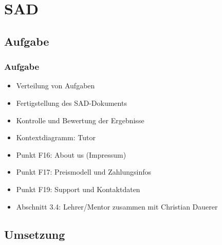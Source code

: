 \section{SAD}
\subsection{Aufgabe}

\begin{frame} %
  \frametitle{Aufgabe} %

  	\begin{itemize}
   		\item Verteilung von Aufgaben
   		\item Fertigstellung des SAD-Dokuments
   		\item Kontrolle und Bewertung der Ergebnisse
  	\end{itemize}
	\bigskip {}
	\begin{itemize}
		\item Kontextdiagramm: Tutor
		\item Punkt F16: About us (Impressum)
		\item Punkt F17: Preismodell und Zahlungsinfos
		\item Punkt F19: Support und Kontaktdaten
		\item Abschnitt 3.4: Lehrer/Mentor zusammen mit Christian Dauerer
	\end{itemize}
\end{frame}

%
%

\subsection{Umsetzung}

